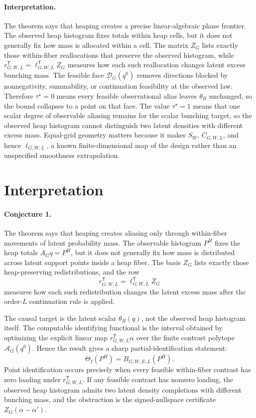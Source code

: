 \documentclass[11pt]{article}
\newcommand{\transpose}{\mathsf{T}}
\theoremstyle{definition}
\theoremstyle{plain}
\theoremstyle{remark}
\begin{document}
\paragraph{Interpretation.}
The theorem says that heaping creates a precise linear-algebraic phase frontier.  The observed heap histogram fixes totals within heap cells, but it does not generally fix how mass is allocated within a cell.  The matrix \(Z_G\) lists exactly those within-fiber reallocations that preserve the observed histogram, while \(r_{G,W,L}^{\transpose}=\ell_{G,W,L}^{\transpose}Z_G\) measures how each such reallocation changes latent excess bunching mass.  The feasible face \(\mathcal{D}_G(q^0)\) removes directions blocked by nonnegativity, summability, or continuation feasibility at the observed law.  Therefore \(\tau^\star=0\) means every feasible observational alias leaves \(\theta_B\) unchanged, so the bound collapses to a point on that face.  The value \(\tau^\star=1\) means that one scalar degree of observable aliasing remains for the scalar bunching target, so the observed heap histogram cannot distinguish two latent densities with different excess mass.  Equal-grid geometry matters because it makes \(S_W\), \(C_{G,W,L}\), and hence \(\ell_{G,W,L}\), a known finite-dimensional map of the design rather than an unspecified smoothness extrapolation.

\section{Interpretation}
\paragraph{Conjecture 1.}
The theorem says that heaping creates aliasing only through within-fiber movements of latent probability mass.  The observable histogram \(P^H\) fixes the heap totals \(A_Gq=P^H\), but it does not generally fix how mass is distributed across latent support points inside a heap fiber.  The basis \(Z_G\) lists exactly those heap-preserving redistributions, and the row
\[
r_{G,W,L}^{\transpose}=\ell_{G,W,L}^{\transpose}Z_G
\]
measures how each such redistribution changes the latent excess mass after the order-\(L\) continuation rule is applied.

The causal target is the latent scalar \(\theta_B(q)\), not the observed heap histogram itself.  The computable identifying functional is the interval obtained by optimizing the explicit linear map \(r_{G,W,L}^{\transpose}\alpha\) over the finite contrast polytope \(\mathcal{A}_G(q^0)\).  Hence the result gives a sharp partial-identification statement:
\[
\Theta_I(P^H)=B_{G,W,E,L}(P^H).
\]
Point identification occurs precisely when every feasible within-fiber contrast has zero loading under \(r_{G,W,L}^{\transpose}\).  If any feasible contrast has nonzero loading, the observed heap histogram admits two latent density completions with different bunching mass, and the obstruction is the signed-nullspace certificate \(Z_G(\alpha-\alpha')\).
\end{document}
